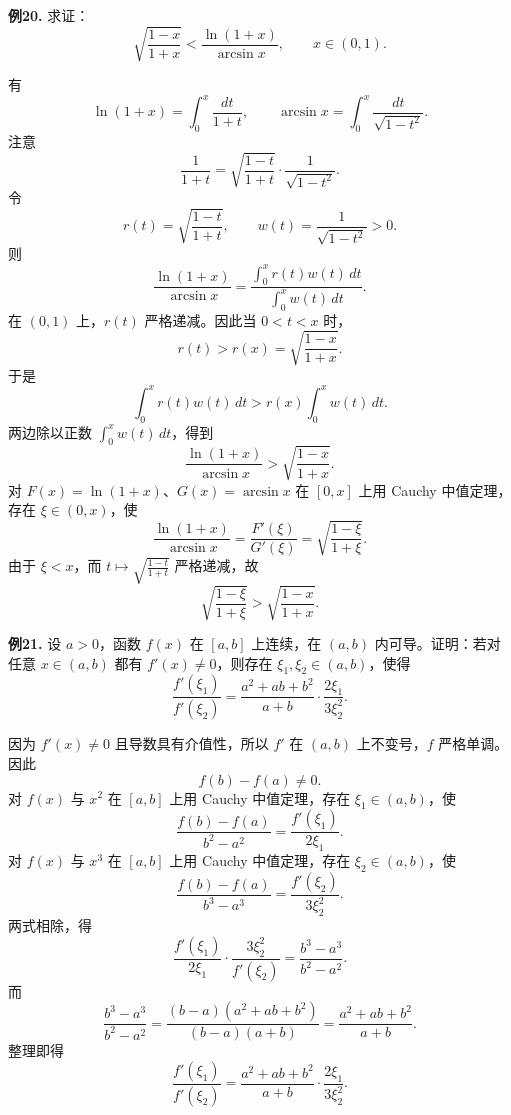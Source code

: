 \begin{problemblock}
\textbf{例20.} 求证：
\[
\sqrt{\frac{1-x}{1+x}}<
\frac{\ln(1+x)}{\arcsin x},\qquad x\in(0,1).
\]
\end{problemblock}
\begin{solutionblock}
有
\[
\ln(1+x)=\int_0^x\frac{dt}{1+t},
\qquad
\arcsin x=\int_0^x\frac{dt}{\sqrt{1-t^2}}.
\]
注意
\[
\frac{1}{1+t}
=\sqrt{\frac{1-t}{1+t}}\cdot\frac1{\sqrt{1-t^2}}.
\]
令
\[
r(t)=\sqrt{\frac{1-t}{1+t}},\qquad
w(t)=\frac1{\sqrt{1-t^2}}>0.
\]
则
\[
\frac{\ln(1+x)}{\arcsin x}
=\frac{\int_0^x r(t)w(t)\,dt}{\int_0^x w(t)\,dt}.
\]
在 \((0,1)\) 上，\(r(t)\) 严格递减。因此当 \(0<t<x\) 时，
\[
r(t)>r(x)=\sqrt{\frac{1-x}{1+x}}.
\]
于是
\[
\int_0^x r(t)w(t)\,dt
>r(x)\int_0^x w(t)\,dt.
\]
两边除以正数 \(\int_0^x w(t)\,dt\)，得到
\[
\frac{\ln(1+x)}{\arcsin x}>
\sqrt{\frac{1-x}{1+x}}.
\]
对 \(F(x)=\ln(1+x)\)、\(G(x)=\arcsin x\) 在 \([0,x]\) 上用 Cauchy 中值定理，存在 \(\xi\in(0,x)\)，使
\[
\frac{\ln(1+x)}{\arcsin x}
=\frac{F'(\xi)}{G'(\xi)}
=\sqrt{\frac{1-\xi}{1+\xi}}.
\]
由于 \(\xi<x\)，而 \(t\mapsto\sqrt{\frac{1-t}{1+t}}\) 严格递减，故
\[
\sqrt{\frac{1-\xi}{1+\xi}}>
\sqrt{\frac{1-x}{1+x}}.
\]
\end{solutionblock}

\begin{problemblock}
\textbf{例21.} 设 \(a>0\)，函数 \(f(x)\) 在 \([a,b]\) 上连续，在 \((a,b)\) 内可导。证明：若对任意 \(x\in(a,b)\) 都有 \(f'(x)\ne0\)，则存在 \(\xi_1,\xi_2\in(a,b)\)，使得
\[
\frac{f'(\xi_1)}{f'(\xi_2)}
=\frac{a^2+ab+b^2}{a+b}\cdot\frac{2\xi_1}{3\xi_2^2}.
\]
\end{problemblock}
\begin{solutionblock}
因为 \(f'(x)\ne0\) 且导数具有介值性，所以 \(f'\) 在 \((a,b)\) 上不变号，\(f\) 严格单调。因此
\[
f(b)-f(a)\ne0.
\]
对 \(f(x)\) 与 \(x^2\) 在 \([a,b]\) 上用 Cauchy 中值定理，存在 \(\xi_1\in(a,b)\)，使
\[
\frac{f(b)-f(a)}{b^2-a^2}
=\frac{f'(\xi_1)}{2\xi_1}.
\]
对 \(f(x)\) 与 \(x^3\) 在 \([a,b]\) 上用 Cauchy 中值定理，存在 \(\xi_2\in(a,b)\)，使
\[
\frac{f(b)-f(a)}{b^3-a^3}
=\frac{f'(\xi_2)}{3\xi_2^2}.
\]
两式相除，得
\[
\frac{f'(\xi_1)}{2\xi_1}\cdot\frac{3\xi_2^2}{f'(\xi_2)}
=\frac{b^3-a^3}{b^2-a^2}.
\]
而
\[
\frac{b^3-a^3}{b^2-a^2}
=\frac{(b-a)(a^2+ab+b^2)}{(b-a)(a+b)}
=\frac{a^2+ab+b^2}{a+b}.
\]
整理即得
\[
\frac{f'(\xi_1)}{f'(\xi_2)}
=\frac{a^2+ab+b^2}{a+b}\cdot\frac{2\xi_1}{3\xi_2^2}.
\]
\end{solutionblock}

